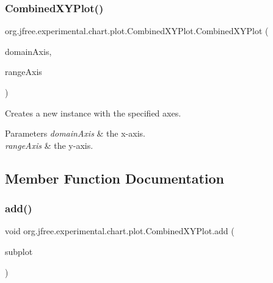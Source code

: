 \subsubsection{\texorpdfstring{Combined\+X\+Y\+Plot()}{CombinedXYPlot()}}
{\footnotesize\ttfamily org.\+jfree.\+experimental.\+chart.\+plot.\+Combined\+X\+Y\+Plot.\+Combined\+X\+Y\+Plot (\begin{DoxyParamCaption}\item[{\mbox{\hyperlink{classorg_1_1jfree_1_1chart_1_1axis_1_1_value_axis}{Value\+Axis}}}]{domain\+Axis,  }\item[{\mbox{\hyperlink{classorg_1_1jfree_1_1chart_1_1axis_1_1_value_axis}{Value\+Axis}}}]{range\+Axis }\end{DoxyParamCaption})}

Creates a new instance with the specified axes.


\begin{DoxyParams}{Parameters}
{\em domain\+Axis} & the x-\/axis. \\
\hline
{\em range\+Axis} & the y-\/axis. \\
\hline
\end{DoxyParams}


\subsection{Member Function Documentation}
\mbox{\label{classorg_1_1jfree_1_1experimental_1_1chart_1_1plot_1_1_combined_x_y_plot_a36aac26f10cc8146a87f4b97f63bf9a1}} 
\subsubsection{\texorpdfstring{add()}{add()}\hspace{0.1cm}{\footnotesize\ttfamily [1/2]}}
{\footnotesize\ttfamily void org.\+jfree.\+experimental.\+chart.\+plot.\+Combined\+X\+Y\+Plot.\+add (\begin{DoxyParamCaption}\item[{\mbox{\hyperlink{classorg_1_1jfree_1_1chart_1_1plot_1_1_x_y_plot}{X\+Y\+Plot}}}]{subplot }\end{DoxyParamCaption})}

